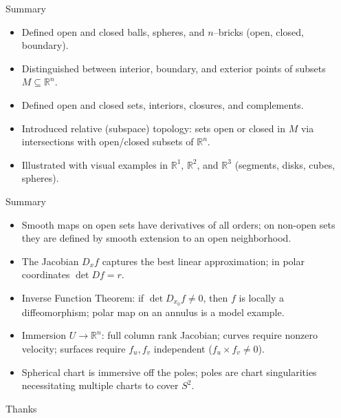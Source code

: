 \begin{frame}{Summary}

\vspace{-0.2cm}
\begin{block}{}
    \begin{itemize}
\item Defined open and closed balls, spheres, and $n$–bricks (open, closed, boundary).
  \item Distinguished between interior, boundary, and exterior points of subsets $M\subseteq\mathbb{R}^n$.
  \item Defined open and closed sets, interiors, closures, and complements.
  \item Introduced relative (subspace) topology: sets open or closed in $M$ via intersections with open/closed subsets of $\mathbb{R}^n$.
  \item Illustrated with visual examples in $\mathbb{R}^1$, $\mathbb{R}^2$, and $\mathbb{R}^3$ (segments, disks, cubes, spheres).
\end{itemize}
\end{block}
\end{frame}

\begin{frame}{Summary}

\vspace{-0.2cm}
\begin{block}{}
    \begin{itemize}
\item Smooth maps on open sets have derivatives of all orders; on non-open sets they are defined by smooth extension to an open neighborhood.
\item The Jacobian $D_x f$ captures the best linear approximation; in polar coordinates $\det D f=r$.
\item Inverse Function Theorem: if $\det D_{x_0}f\neq 0$, then $f$ is locally a diffeomorphism; polar map on an annulus is a model example.
\item Immersion $U\to\mathbb{R}^n$: full column rank Jacobian; curves require nonzero velocity; surfaces require $f_u,f_v$ independent ($f_u\times f_v\neq 0$).
\item Spherical chart is immersive off the poles; poles are chart singularities necessitating multiple charts to cover $S^2$.
\end{itemize}
\end{block}
\end{frame}

\begin{frame}{Thanks}
  \cmcendframe
\end{frame}


